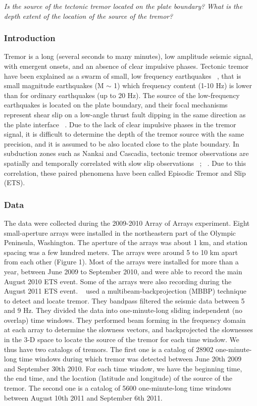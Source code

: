 \documentclass[letterpaper, 12pt]{article}
\begin{document}
\textit{Is the source of the tectonic tremor located on the plate boundary? What is the depth extent of the location of the source of the tremor?}

\subsubsection{Introduction}

Tremor is a long (several seconds to many minutes), low amplitude seismic signal, with emergent onsets, and an absence of clear impulsive phases. Tectonic tremor have been explained as a swarm of small, low frequency earthquakes ~\cite{SHE_2007}, that is small magnitude earthquakes (M $\sim$ 1) which frequency content (1-10 Hz) is lower than for ordinary earthquakes (up to 20 Hz). The source of the low-frequency earthquakes is located on the plate boundary, and their focal mechanisms represent shear slip on a low-angle thrust fault dipping in the same direction as the plate interface ~\cite{IDE_2007}. Due to the lack of clear impulsive phases in the tremor signal, it is difficult to determine the depth of the tremor source with the same precision, and it is assumed to be also located close to the plate boundary. In subduction zones such as Nankai and Cascadia, tectonic tremor observations are spatially and temporally correlated with slow slip observations ~\cite{OBA_2002}; ~\cite{ROG_2003}. Due to this correlation, these paired phenomena have been called Episodic Tremor and Slip (ETS).

\subsubsection{Data}

The data were collected during the 2009-2010 Array of Arrays experiment. Eight small-aperture arrays were installed in the northeastern part of the Olympic Peninsula, Washington. The aperture of the arrays was about 1 km, and station spacing was a few hundred meters. The arrays were around 5 to 10 km apart from each other (Figure 1). Most of the arrays were installed for more than a year, between June 2009 to September 2010, and were able to record the main August 2010 ETS event. Some of the arrays were also recording during the August 2011 ETS event. ~\cite{GHO_2012} used a multibeam-backprojection (MBBP) technique to detect and locate tremor. They bandpass filtered the seismic data between 5 and 9 Hz. They divided the data into one-minute-long sliding independent (no overlap) time windows. They performed beam forming in the frequency domain at each array to determine the slowness vectors, and backprojected the slownesses in the 3-D space to locate the source of the tremor for each time window. We thus have two catalogs of tremors. The first one is a catalog of 28902 one-minute-long time windows during which tremor was detected between June 20th 2009 and September 30th 2010. For each time window, we have the beginning time, the end time, and the location (latitude and longitude) of the source of the tremor. The second one is a catalog of 5600 one-minute-long time windows between August 10th 2011 and September 6th 2011.
\end{document}
